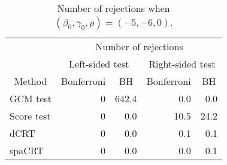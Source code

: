 \begin{table}[!h]
\centering
\caption{\label{tab:simulation_rejection_beta_-5_gamma_-6}Number of rejections when $(\beta_0,\gamma_0,\rho) = (-5, -6, 0)$.}
\centering
\begin{tabular}[t]{lrrrr}
\toprule
\multicolumn{1}{c}{ } & \multicolumn{4}{c}{Number of rejections} \\
\cmidrule(l{3pt}r{3pt}){2-5}
\multicolumn{1}{c}{ } & \multicolumn{2}{c}{Left-sided test} & \multicolumn{2}{c}{Right-sided test} \\
\cmidrule(l{3pt}r{3pt}){2-3} \cmidrule(l{3pt}r{3pt}){4-5}
\multicolumn{1}{c}{Method} & \multicolumn{1}{c}{Bonferroni} & \multicolumn{1}{c}{BH} & \multicolumn{1}{c}{Bonferroni} & \multicolumn{1}{c}{BH} \\
\cmidrule(l{3pt}r{3pt}){1-1} \cmidrule(l{3pt}r{3pt}){2-2} \cmidrule(l{3pt}r{3pt}){3-3} \cmidrule(l{3pt}r{3pt}){4-4} \cmidrule(l{3pt}r{3pt}){5-5}
GCM test & 0 & 642.4 & 0.0 & 0.0\\
Score test & 0 & 0.0 & 10.5 & 24.2\\
dCRT & 0 & 0.0 & 0.1 & 0.1\\
spaCRT & 0 & 0.0 & 0.0 & 0.1\\
\bottomrule
\end{tabular}
\end{table}
